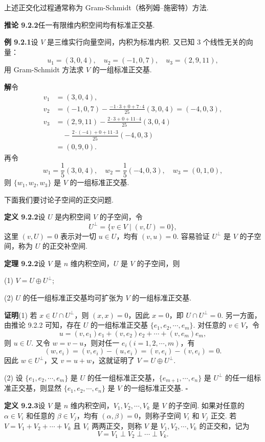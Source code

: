 \documentclass[UTF8,12pt,a4paper,fontset=fandol]{ctexart}
\begin{document}
上述正交化过程通常称为 Gram-Schmidt（格列姆--施密特）方法.

\noindent\textbf{推论 9.2.2}\quad 任一有限维内积空间均有标准正交基.

\noindent\textbf{例 9.2.1}\quad 设 $V$ 是三维实行向量空间，内积为标准内积. 又已知 3 个线性无关的向量：
\[
  u_1=(3,0,4),\quad u_2=(-1,0,7),\quad u_3=(2,9,11),
\]
用 Gram-Schmidt 方法求 $V$ 的一组标准正交基.

\noindent\textbf{解}\quad 令
\[
\begin{aligned}
  v_1&=(3,0,4),\\
  v_2&=(-1,0,7)-\frac{-1\cdot3+0+7\cdot4}{25}(3,0,4)=(-4,0,3),\\
  v_3&=(2,9,11)-\frac{2\cdot3+0+11\cdot4}{25}(3,0,4)\\
  &\quad-\frac{2\cdot(-4)+0+11\cdot3}{25}(-4,0,3)\\
  &=(0,9,0).
\end{aligned}
\]
再令
\[
  w_1=\frac15(3,0,4),\quad w_2=\frac15(-4,0,3),\quad w_3=(0,1,0),
\]
则 $\{w_1,w_2,w_3\}$ 是 $V$ 的一组标准正交基.

下面我们要讨论子空间的正交问题.

\noindent\textbf{定义 9.2.2}\quad 设 $U$ 是内积空间 $V$ 的子空间，令
\[
  U^\perp=\{v\in V\mid (v,U)=0\},
\]
这里 $(v,U)=0$ 表示对一切 $u\in U$，均有 $(v,u)=0$. 容易验证 $U^\perp$ 是 $V$ 的子空间，称为 $U$ 的正交补空间.

\noindent\textbf{定理 9.2.2}\quad 设 $V$ 是 $n$ 维内积空间，$U$ 是 $V$ 的子空间，则

(1) $V=U\oplus U^\perp$;

(2) $U$ 的任一组标准正交基均可扩张为 $V$ 的一组标准正交基.

\noindent\textbf{证明}\quad (1) 若 $x\in U\cap U^\perp$，则 $(x,x)=0$，因此 $x=0$，即 $U\cap U^\perp=0$. 另一方面，由推论 9.2.2 可知，存在 $U$ 的一组标准正交基 $\{e_1,e_2,\cdots,e_m\}$. 对任意的 $v\in V$，令
\[
  u=(v,e_1)e_1+(v,e_2)e_2+\cdots+(v,e_m)e_m,
\]
则 $u\in U$. 又令 $w=v-u$，则对任一 $e_i(i=1,2,\cdots,m)$，有
\[
  (w,e_i)=(v,e_i)-(u,e_i)=(v,e_i)-(v,e_i)=0.
\]
因此 $w\in U^\perp$，又 $v=u+w$，这就证明了 $V=U\oplus U^\perp$.

(2) 设 $\{e_1,e_2,\cdots,e_m\}$ 是 $U$ 的任一组标准正交基，$\{e_{m+1},\cdots,e_n\}$ 是 $U^\perp$ 的任一组标准正交基，则显然 $\{e_1,e_2,\cdots,e_n\}$ 是 $V$ 的一组标准正交基. $\square$

\noindent\textbf{定义 9.2.3}\quad 设 $V$ 是 $n$ 维内积空间，$V_1,V_2,\cdots,V_k$ 是 $V$ 的子空间. 如果对任意的 $\alpha\in V_i$ 和任意的 $\beta\in V_j$，均有 $(\alpha,\beta)=0$，则称子空间 $V_i$ 和 $V_j$ 正交. 若 $V=V_1+V_2+\cdots+V_k$ 且 $V_i$ 两两正交，则称 $V$ 是 $V_1,V_2,\cdots,V_k$ 的正交和，记为
\[
  V=V_1\perp V_2\perp\cdots\perp V_k.
\]
\end{document}
